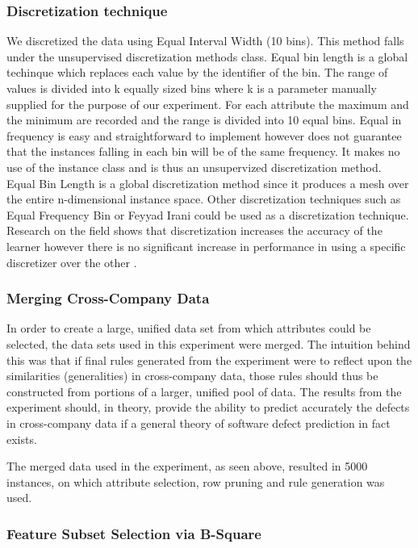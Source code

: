 \documentclass{sig-alternate}
\begin{document}
\subsubsection{Discretization technique}
We discretized the data using Equal Interval Width (10 bins). This method falls under the unsupervised discretization methods class. Equal bin length is a global techinque which replaces each value by the identifier of the bin. The range of values is divided into k equally sized bins where k is a parameter manually supplied for the purpose of our experiment. For each attribute the maximum and the minimum are recorded and the range is divided into 10 equal bins. Equal in frequency is easy and straightforward to implement however does not guarantee that the instances falling in each bin will be of the same frequency. It makes no use of the instance class and is thus an unsupervized discretization method. Equal Bin Length is a global discretization method since it produces a mesh over the entire n-dimensional instance space. Other discretization techniques such as Equal Frequency Bin or Feyyad Irani could be used as a discretization technique. Research on the field shows that discretization increases the accuracy of the learner however there is no significant increase in performance in using a specific discretizer over the other \cite {dough95}.

\subsubsection{Merging Cross-Company Data}

In order to create a large, unified data set from which attributes could be selected, the data sets used in this experiment were merged. The intuition behind this was that if final rules generated from the experiment were to reflect upon the similarities (generalities) in cross-company data, those rules should thus be constructed from portions of a larger, unified pool of data. The results from the experiment should, in theory, provide the ability to predict accurately the defects in cross-company data if a general theory of software defect prediction in fact exists.

The merged data used in the experiment, as seen above, resulted in 5000 instances, on which attribute selection, row pruning and rule generation was used.

\subsubsection{Feature Subset Selection via B-Square}
\end{document}

